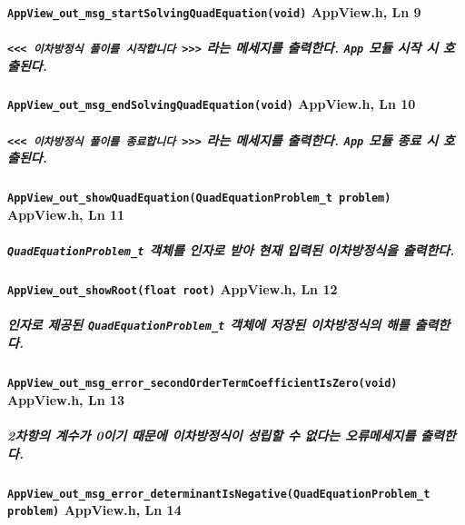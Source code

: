 \documentclass{article}
\begin{document}
    \paragraph{\large\texttt{AppView\_out\_msg\_startSolvingQuadEquation(void)} \tiny AppView.h, Ln 9}

    \subparagraph{\normalfont\texttt{<<< 이차방정식 풀이를 시작합니다 >>>} 라는 메세지를 출력한다. \texttt{App} 모듈 시작 시 호출된다.}

    \paragraph{\large\texttt{AppView\_out\_msg\_endSolvingQuadEquation(void)} \tiny AppView.h, Ln 10}

    \subparagraph{\normalfont\texttt{<<< 이차방정식 풀이를 종료합니다 >>>} 라는 메세지를 출력한다. \texttt{App} 모듈 종료 시 호출된다.}

    \paragraph{\large\texttt{AppView\_out\_showQuadEquation(QuadEquationProblem\_t problem)} \tiny AppView.h, Ln 11}
    
    \subparagraph{\normalfont \texttt{QuadEquationProblem\_t} 객체를 인자로 받아 현재 입력된 이차방정식을 출력한다.}

    \paragraph{\large\texttt{AppView\_out\_showRoot(float root)} \tiny AppView.h, Ln 12}

    \subparagraph{\normalfont 인자로 제공된 \texttt{QuadEquationProblem\_t} 객체에 저장된 이차방정식의 해를 출력한다.}

    \paragraph{\large\texttt{AppView\_out\_msg\_error\_secondOrderTermCoefficientIsZero(void)} \tiny AppView.h, Ln 13}

    \subparagraph{\normalfont 2차항의 계수가 0이기 때문에 이차방정식이 성립할 수 없다는 오류메세지를 출력한다.}

    \paragraph{\large\texttt{AppView\_out\_msg\_error\_determinantIsNegative(QuadEquationProblem\_t problem)} \tiny AppView.h, Ln 14}
\end{document}
